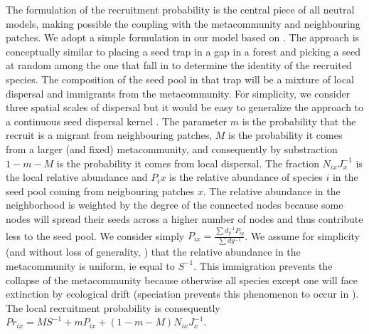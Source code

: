 \documentclass[12pt]{article}
\begin{document}
The formulation of the recruitment probability is the central piece of all
neutral models, making possible the coupling with the metacommunity and
neighbouring patches. We adopt a simple formulation in our model based on
\parencite{Gravel2006}. The approach is conceptually similar to placing a seed
trap in a gap in a forest and picking a seed at random among the one that fall
in to determine the identity of the recruited species. The composition of the
seed pool in that trap will be a mixture of local dispersal and immigrants from
the metacommunity. For simplicity, we consider three spatial scales of dispersal
but it would be easy to generalize the approach to a continuous seed dispersal
kernel \parencite{Gravel2006}. The parameter $m$ is the probability that the
recruit is a migrant from neighbouring patches, $M$ is the probability it comes
from a larger (and fixed) metacommunity, and consequently by substraction
$1-m-M$ is the probability it comes from local dispersal. The fraction
$N_{ix}J_x^{-1}$ is the local relative abundance and $P_ix$ is the relative
abundance of species $i$ in the seed pool coming from neigbouring patches $x$.
The relative abundance in the neighborhood is weighted by the degree of the
connected nodes because some nodes will spread their seeds across a higher
number of nodes and thus contribute less to the seed pool. We consider simply
$P_{ix} =\frac{\sum d_y^{-1}P_{iy}}{\sum dy^{-1}}$.  We assume for simplicity
(and without loss of generality, \parencite{Bell2000}) that the relative
abundance in the metacommunity is uniform, ie equal to $S^{-1}$. This
immigration prevents the collapse of the metacommunity because otherwise all
species except one will face extinction by ecological drift (speciation prevents
this phenomenon to occur in \textcite{Hubbell2001}). The local recruitment
probability is consequently $Pr_{ix} = MS^{-1} + mP_{ix} +
(1-m-M)N_{ix}J_x^{-1}$.  
\end{document}

